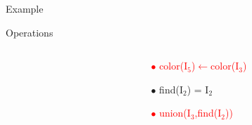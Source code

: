 \begin{frame}{Example}
\begin{overlayarea}{\textwidth}{\textheight}
{\begin{block}{Operations}
\begin{columns}[T]
\begin{column}{.48\textwidth}
\begin{itemize}
        \end{itemize}
      \end{column}
      \begin{column}{.48\textwidth}
        \begin{itemize}
          \item[\textcolor{red}{$\bullet$}]\textcolor{red}{color($\mathrm{I_{5}}$)$\leftarrow$color($\mathrm{I_{3}}$)}
          \item[$\bullet$]find($\mathrm{I_{2}}$) = $\mathrm{I_{2}}$
          \item[\textcolor{red}{$\bullet$}]\textcolor{red}{union($\mathrm{I_{3}}$,find($\mathrm{I_{2}}$))}
        \end{itemize}
      \end{column}
      \end{columns}  
    \end{block}
  }
  
   
\end{overlayarea}
\end{frame}
